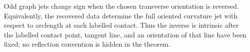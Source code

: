 \begin{remark}
Odd graph jets change sign when the chosen transverse orientation is
reversed.  Equivalently, the recovered data determine the full oriented
curvature jet with respect to arclength at each labelled contact.  Thus the
inverse is intrinsic after the labelled contact point, tangent line, and an
orientation of that line have been fixed; no reflection convention is hidden
in the theorem.
\end{remark}
